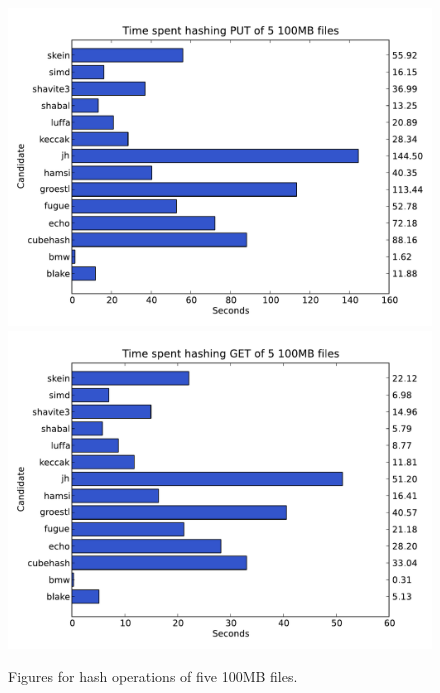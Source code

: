 \documentclass[english,12pt,a4paper]{book}
\begin{document}
\begin{figure}[h!]
    \centering
    \includegraphics[width=0.9\columnwidth]{graphs/TimespenthashingPUTof5100MBfiles.pdf}
    \includegraphics[width=0.9\columnwidth]{graphs/TimespenthashingGETof5100MBfiles.pdf}
    \caption{Figures for hash operations of five 100MB files.}
    \label{fig:graph:5100mb}
\end{figure}
\end{document}
